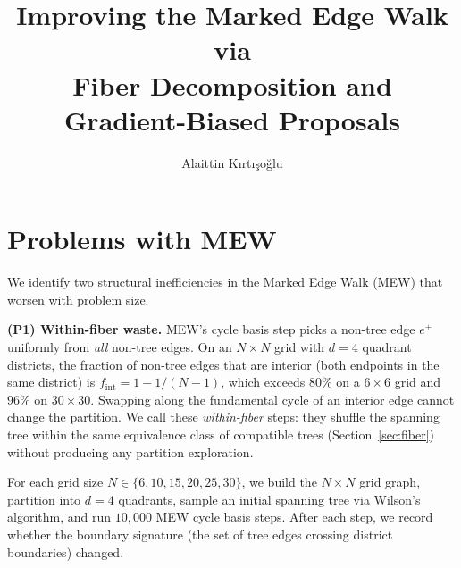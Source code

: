 \documentclass[11pt]{article}
\begin{document}
\title{Improving the Marked Edge Walk via\\Fiber Decomposition and Gradient-Biased Proposals}
\author{Alaittin K\i rt\i \c{s}o\u{g}lu}
\maketitle

\tableofcontents


\section{Problems with MEW}\label{sec:problems}

We identify two structural inefficiencies in the Marked Edge Walk (MEW)
that worsen with problem size.

\medskip\noindent
\textbf{(P1) Within-fiber waste.}
MEW's cycle basis step picks a non-tree edge $e^+$ uniformly from \emph{all}
non-tree edges. On an $N \times N$ grid with $d = 4$ quadrant districts,
the fraction of non-tree edges that are interior (both endpoints in the same
district) is $f_{\mathrm{int}} = 1 - 1/(N-1)$, which exceeds $80\%$ on a
$6 \times 6$ grid and $96\%$ on $30 \times 30$. Swapping along the fundamental
cycle of an interior edge cannot change the partition. We call these
\emph{within-fiber} steps: they shuffle the spanning tree within the same
equivalence class of compatible trees (Section~\ref{sec:fiber}) without
producing any partition exploration.

For each grid size $N \in \{6, 10, 15, 20, 25, 30\}$, we build the
$N \times N$ grid graph, partition into $d = 4$ quadrants, sample an initial
spanning tree via Wilson's algorithm, and run $10{,}000$ MEW cycle basis steps.
After each step, we record whether the boundary signature (the set of tree
edges crossing district boundaries) changed.
\end{document}
